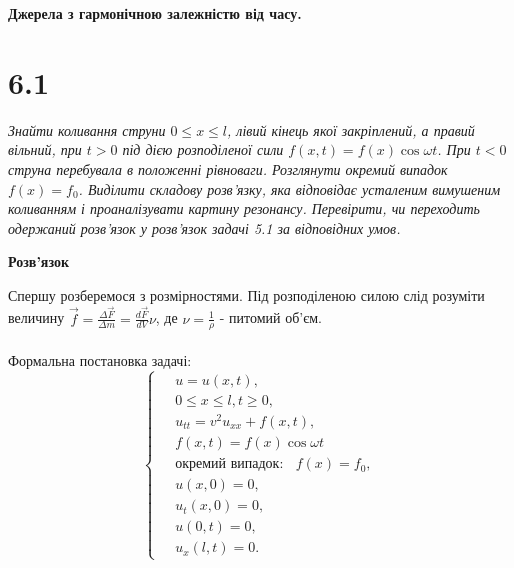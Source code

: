 

%



\textbf{\large Джерела з гармонічною залежністю від часу.}

\section[Задача №6.1]{6.1}

\textit{Знайти коливання струни $0 \leq x \leq l$, лівий кінець якої закріплений, а правий вільний, при $t > 0$ під дією розподіленої сили $f(x,t) = f(x)\cos\omega t$. При $t < 0$ струна перебувала в положенні рівноваги. Розглянути окремий випадок $f(x) = f_0$. Виділити складову розв’язку, яка відповідає усталеним вимушеним коливанням і проаналізувати картину резонансу. Перевірити, чи переходить одержаний розв’язок у розв’язок задачі 5.1 за відповідних умов.}

\begin{center}
    \large{\textbf{Розв'язок}}
\end{center}

\noindent Спершу розберемося з розмірностями. Під розподіленою силою слід розуміти величину $\vec{f}=\frac{\Delta \vec{F}}{\Delta m} = \frac{d\vec{F}}{dV} \nu$, де $\nu =\frac 1\rho$ - питомий об'єм.
\\
\\
\noindent Формальна постановка задачі:
\begin{equation} \label{sweat}
    \left\{ \begin{aligned} %
            \;&u = u(x,t), \\
            &0 \leq x \leq l, t \geq 0, \\
            &u_{tt}=v^2u_{xx}+f(x,t), \\
            &f(x,t)=f(x)\cos\omega t\\
            &\text{окремий випадок: }\;\; f(x)= f_0,\\
            &u(x,0)=0,\\
            &u_t(x,0)=0,\\
            &u(0,t) =0, \\
            &u_x(l,t) =0 . 
    \end{aligned} \right.
\end{equation}
\\

